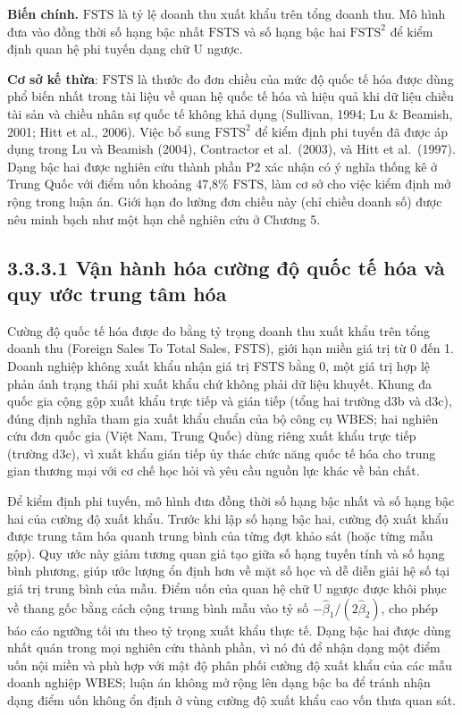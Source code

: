 \documentclass[
  a4paper,
  13pt]{extreport}
\begin{document}
\textbf{Biến chính.} \(\mathrm{FSTS}\) là tỷ lệ doanh thu xuất khẩu trên
tổng doanh thu. Mô hình đưa vào đồng thời số hạng bậc nhất
\(\mathrm{FSTS}\) và số hạng bậc hai \(\mathrm{FSTS}^{2}\) để kiểm định
quan hệ phi tuyến dạng chữ U ngược.

\textbf{Cơ sở kế thừa}: \(\mathrm{FSTS}\) là thước đo đơn chiều của mức
độ quốc tế hóa được dùng phổ biến nhất trong tài liệu về quan hệ quốc tế
hóa và hiệu quả khi dữ liệu chiều tài sản và chiều nhân sự quốc tế không
khả dụng (Sullivan, 1994; Lu \& Beamish, 2001; Hitt et al., 2006). Việc
bổ sung \(\mathrm{FSTS}^{2}\) để kiểm định phi tuyến đã được áp dụng
trong Lu và Beamish (2004), Contractor et al.~(2003), và Hitt et
al.~(1997). Dạng bậc hai được nghiên cứu thành phần P2 xác nhận có ý
nghĩa thống kê ở Trung Quốc với điểm uốn khoảng 47,8\%
\(\mathrm{FSTS}\), làm cơ sở cho việc kiểm định mở rộng trong luận án.
Giới hạn đo lường đơn chiều này (chỉ chiều doanh số) được nêu minh bạch
như một hạn chế nghiên cứu ở Chương 5.

\hypertarget{vux1eadn-huxe0nh-huxf3a-cux1b0ux1eddng-ux111ux1ed9-quux1ed1c-tux1ebf-huxf3a-vuxe0-quy-ux1b0ux1edbc-trung-tuxe2m-huxf3a}{%
\subsection{3.3.3.1 Vận hành hóa cường độ quốc tế hóa và quy ước trung
tâm
hóa}\label{vux1eadn-huxe0nh-huxf3a-cux1b0ux1eddng-ux111ux1ed9-quux1ed1c-tux1ebf-huxf3a-vuxe0-quy-ux1b0ux1edbc-trung-tuxe2m-huxf3a}}

Cường độ quốc tế hóa được đo bằng tỷ trọng doanh thu xuất khẩu trên tổng
doanh thu (Foreign Sales To Total Sales, FSTS), giới hạn miền giá trị từ
0 đến 1. Doanh nghiệp không xuất khẩu nhận giá trị FSTS bằng 0, một giá
trị hợp lệ phản ánh trạng thái phi xuất khẩu chứ không phải dữ liệu
khuyết. Khung đa quốc gia cộng gộp xuất khẩu trực tiếp và gián tiếp
(tổng hai trường d3b và d3c), đúng định nghĩa tham gia xuất khẩu chuẩn
của bộ công cụ WBES; hai nghiên cứu đơn quốc gia (Việt Nam, Trung Quốc)
dùng riêng xuất khẩu trực tiếp (trường d3c), vì xuất khẩu gián tiếp ủy
thác chức năng quốc tế hóa cho trung gian thương mại với cơ chế học hỏi
và yêu cầu nguồn lực khác về bản chất.

Để kiểm định phi tuyến, mô hình đưa đồng thời số hạng bậc nhất và số
hạng bậc hai của cường độ xuất khẩu. Trước khi lập số hạng bậc hai,
cường độ xuất khẩu được trung tâm hóa quanh trung bình của từng đợt khảo
sát (hoặc từng mẫu gộp). Quy ước này giảm tương quan giả tạo giữa số
hạng tuyến tính và số hạng bình phương, giúp ước lượng ổn định hơn về
mặt số học và dễ diễn giải hệ số tại giá trị trung bình của mẫu. Điểm
uốn của quan hệ chữ U ngược được khôi phục về thang gốc bằng cách cộng
trung bình mẫu vào tỷ số \(-\hat\beta_1 / (2\hat\beta_2)\), cho phép báo
cáo ngưỡng tối ưu theo tỷ trọng xuất khẩu thực tế. Dạng bậc hai được
dùng nhất quán trong mọi nghiên cứu thành phần, vì nó đủ để nhận dạng
một điểm uốn nội miền và phù hợp với mật độ phân phối cường độ xuất khẩu
của các mẫu doanh nghiệp WBES; luận án không mở rộng lên dạng bậc ba để
tránh nhận dạng điểm uốn không ổn định ở vùng cường độ xuất khẩu cao vốn
thưa quan sát.
\end{document}
